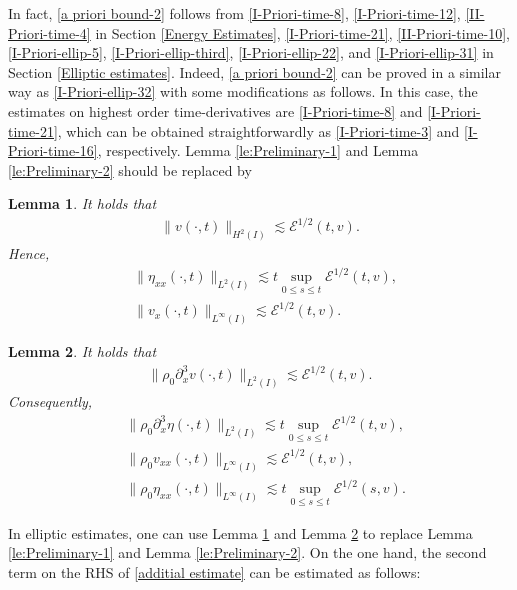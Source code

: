\documentclass[11pt, reqno]{amsart}
\newtheorem{lemma}{Lemma}
\numberwithin{equation}{section}
\begin{document}
{In fact, \eqref{a priori bound-2} follows from \eqref{I-Priori-time-8}, \eqref{I-Priori-time-12}, \eqref{II-Priori-time-4} in Section \ref{Energy Estimates},  \eqref{I-Priori-time-21}, \eqref{II-Priori-time-10}, \eqref{I-Priori-ellip-5}, \eqref{I-Priori-ellip-third}, \eqref{I-Priori-ellip-22}, and \eqref{I-Priori-ellip-31} in Section \ref{Elliptic estimates}. Indeed, \eqref{a priori bound-2} can be proved in a similar way as \eqref{I-Priori-ellip-32} with some modifications as follows.
In this case, the estimates on highest order
time-derivatives are \eqref{I-Priori-time-8} and
\eqref{I-Priori-time-21}, which can be obtained straightforwardly as \eqref{I-Priori-time-3} and \eqref{I-Priori-time-16}, respectively. Lemma \ref{le:Preliminary-1} and Lemma \ref{le:Preliminary-2} should be replaced by
\begin{lemma}\label{le:Preliminary-3} It holds that
	\begin{align}\label{Preliminary-10}
		\|v(\cdot,t)\|_{H^2(I)}\lesssim \mathcal{E}^{1/2}(t,v).
	\end{align}
Hence,
	\begin{align}
		&\|\eta_{xx}(\cdot,t)\|_{L^2(I)}\lesssim t\sup_{0\leq s\leq t}\mathcal{E}^{1/2}(t,v),\label{Preliminary-11}\\
		&\|v_x(\cdot,t)\|_{L^\infty(I)}
		\lesssim \mathcal{E}^{1/2}(t,v).\label{Preliminary-12}
	\end{align}
\end{lemma}
\begin{lemma}\label{le:Preliminary-4} It holds that
	{\small \begin{align}\label{Preliminary-13}
			\|\rho_0\partial_x^3v(\cdot,t)\|_{L^2(I)}\lesssim \mathcal{E}^{1/2}(t,v).
	\end{align}}
Consequently,
	{\small \begin{align}
			&\|\rho_0\partial_x^3\eta(\cdot,t)\|_{L^2(I)}
			\lesssim t\sup_{0\leq s\leq t}\mathcal{E}^{1/2}(t,v),\label{Preliminary-14}\\
			&\|\rho_0v_{xx}(\cdot,t)\|_{L^\infty(I)}\lesssim \mathcal{E}^{1/2}(t,v),\label{Preliminary-15}\\
			&\|\rho_0\eta_{xx}(\cdot,t)\|_{L^\infty(I)}
			\lesssim t\sup_{0\leq s\leq t}\mathcal{E}^{1/2}(s,v)\label{Preliminary-16}.
	\end{align}}
\end{lemma}
In elliptic estimates, one can use Lemma \ref{le:Preliminary-3} and Lemma \ref{le:Preliminary-4} to replace Lemma \ref{le:Preliminary-1} and Lemma \ref{le:Preliminary-2}. On the one hand, the second term on the RHS of \eqref{additial estimate} can be estimated as follows:
}
\end{document}
